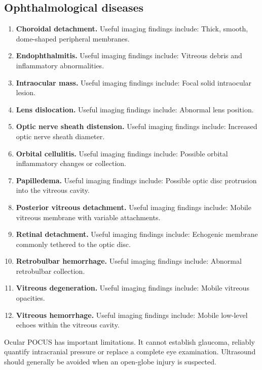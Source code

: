 \subsection{Ophthalmological diseases}
\begin{enumerate}[leftmargin=*,itemsep=0.45em,topsep=0.4em]
\item \textbf{Choroidal detachment.} Useful imaging findings include: Thick, smooth, dome-shaped peripheral membranes.
\item \textbf{Endophthalmitis.} Useful imaging findings include: Vitreous debris and inflammatory abnormalities.
\item \textbf{Intraocular mass.} Useful imaging findings include: Focal solid intraocular lesion.
\item \textbf{Lens dislocation.} Useful imaging findings include: Abnormal lens position.
\item \textbf{Optic nerve sheath distension.} Useful imaging findings include: Increased optic nerve sheath diameter.
\item \textbf{Orbital cellulitis.} Useful imaging findings include: Possible orbital inflammatory changes or collection.
\item \textbf{Papilledema.} Useful imaging findings include: Possible optic disc protrusion into the vitreous cavity.
\item \textbf{Posterior vitreous detachment.} Useful imaging findings include: Mobile vitreous membrane with variable attachments.
\item \textbf{Retinal detachment.} Useful imaging findings include: Echogenic membrane commonly tethered to the optic disc.
\item \textbf{Retrobulbar hemorrhage.} Useful imaging findings include: Abnormal retrobulbar collection.
\item \textbf{Vitreous degeneration.} Useful imaging findings include: Mobile vitreous opacities.
\item \textbf{Vitreous hemorrhage.} Useful imaging findings include: Mobile low-level echoes within the vitreous cavity.
\end{enumerate}
Ocular POCUS has important limitations. It cannot establish glaucoma, reliably quantify intracranial pressure or replace a complete eye examination. Ultrasound should generally be avoided when an open-globe injury is suspected.

